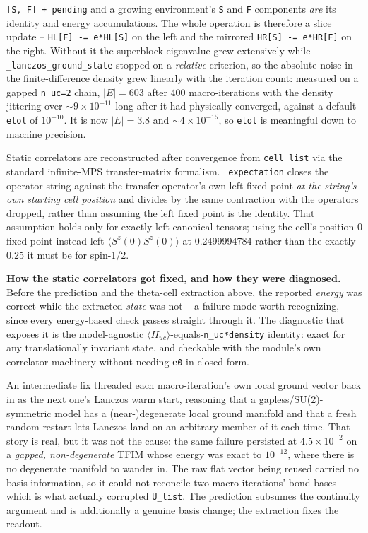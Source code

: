 \documentclass[11pt]{article}
\begin{document}
\begin{itemize}
  \texttt{[S, F] + pending} and a growing environment's \texttt{S} and
  \texttt{F} components \emph{are} its identity and energy accumulations.
  The whole operation is therefore a slice update --
  \texttt{HL[F] -= e*HL[S]} on the left and the mirrored
  \texttt{HR[S] -= e*HR[F]} on the right. Without it the superblock
  eigenvalue grew extensively while \texttt{\_lanczos\_ground\_state}
  stopped on a \emph{relative} criterion, so the absolute noise in the
  finite-difference density grew linearly with the iteration count:
  measured on a gapped \texttt{n\_uc=2} chain, $|E| = 603$ after 400
  macro-iterations with the density jittering over
  ${\sim}9\times10^{-11}$ long after it had physically converged, against
  a default \texttt{etol} of $10^{-10}$. It is now $|E| = 3.8$ and
  ${\sim}4\times10^{-15}$, so \texttt{etol} is meaningful down to machine
  precision.
\end{itemize}

Static correlators are reconstructed after convergence from
\texttt{cell\_list} via the standard infinite-MPS transfer-matrix
formalism. \texttt{\_expectation} closes the operator string against the
transfer operator's own left fixed point \emph{at the string's own
starting cell position} and divides by the same contraction with the
operators dropped, rather than assuming the left fixed point is the
identity. That assumption holds only for exactly left-canonical tensors;
using the cell's position-0 fixed point instead left
$\langle S^z(0)S^z(0)\rangle$ at 0.2499994784 rather than the
exactly-0.25 it must be for spin-1/2.

\textbf{How the static correlators got fixed, and how they were
diagnosed.} Before the prediction and the theta-cell extraction above, the
reported \emph{energy} was correct while the extracted \emph{state} was
not -- a failure mode worth recognizing, since every energy-based check
passes straight through it. The diagnostic that exposes it is the
model-agnostic $\langle H_{uc}\rangle$-equals-\texttt{n\_uc*density}
identity: exact for any translationally invariant state, and checkable
with the module's own correlator machinery without needing \texttt{e0} in
closed form.

An intermediate fix threaded each macro-iteration's own local ground
vector back in as the next one's Lanczos warm start, reasoning that a
gapless/SU(2)-symmetric model has a (near-)degenerate local ground
manifold and that a fresh random restart lets Lanczos land on an arbitrary
member of it each time. That story is real, but it was not the cause: the
same failure persisted at $4.5\times10^{-2}$ on a \emph{gapped,
non-degenerate} TFIM whose energy was exact to $10^{-12}$, where there is
no degenerate manifold to wander in. The raw flat vector being reused
carried no basis information, so it could not reconcile two
macro-iterations' bond bases -- which is what actually corrupted
\texttt{U\_list}. The prediction subsumes the continuity argument and is
additionally a genuine basis change; the extraction fixes the readout.
\end{document}
